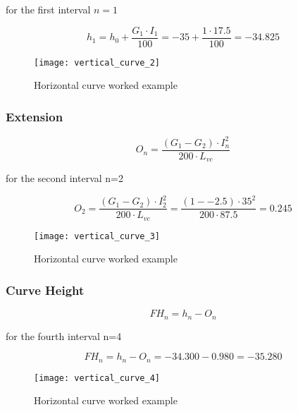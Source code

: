 \documentclass{bcrre_exam}
\begin{document}
for the first interval $n=1$ 

\begin{equation}
    h_1=h_0+\frac{G_1 \cdot I_1}{100}=-35+\frac{1 \cdot 17.5}{100} = -34.825
\end{equation}

\begin{figure}[h]
    \centering
    \texttt{[image: vertical\_curve\_2]}
    \caption{Horizontal curve worked example}
    \label{fig:hoz-cur-2}
\end{figure}

\subsubsection*{Extension}

\begin{equation}
    O_n=\frac{(G_1-G_2) \cdot I_n^2}{200 \cdot L_{vc}}
\end{equation}

for the second interval n=2

\begin{equation}
    O_2=\frac{(G_1-G_2) \cdot I_2^2}{200 \cdot L_{vc}} = \frac{(1--2.5) \cdot 35^2}{200 \cdot 87.5} = 0.245
\end{equation}

\begin{figure}[h]
    \centering
    \texttt{[image: vertical\_curve\_3]}
    \caption{Horizontal curve worked example}
    \label{fig:hoz-cur-3}
\end{figure}

\subsubsection*{Curve Height}

\begin{equation}
    FH_n=h_n - O_n
\end{equation}

for the fourth interval n=4

\begin{equation}
    FH_n=h_n - O_n = -34.300-0.980=-35.280
\end{equation}

\begin{figure}[h]
    \centering
    \texttt{[image: vertical\_curve\_4]}
    \caption{Horizontal curve worked example}
    \label{fig:hoz-cur-4}
\end{figure}
\end{document}
